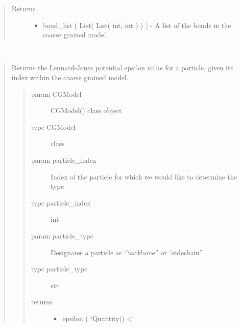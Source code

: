 \documentclass[letterpaper,12pt,english,openany,oneside]{sphinxmanual}
\begin{document}
\begin{fulllineitems}
\begin{fulllineitems}
\begin{quote}
\begin{description}
\item[{Returns}] \leavevmode
\begin{itemize}
\item {} 
bond\_list ( List( List( int, int ) ) ) - A list of the bonds in the coarse grained model.

\end{itemize}


\end{description}\end{quote}

\end{fulllineitems}


\begin{fulllineitems}
\label{\detokenize{cg_model:cg_model.cgmodel.CGModel.get_epsilon}}~\begin{quote}

Returns the Lennard-Jones potential epsilon value for a particle, given its index within the coarse grained model.
\begin{quote}\begin{description}
\item[{param CGModel}] \leavevmode
CGModel() class object

\item[{type CGModel}] \leavevmode
class

\item[{param particle\_index}] \leavevmode
Index of the particle for which we would like to determine the type

\item[{type particle\_index}] \leavevmode
int

\item[{param particle\_type}] \leavevmode
Designates a particle as “backbone” or “sidechain”

\item[{type particle\_type}] \leavevmode
str

\item[{returns}] \leavevmode\begin{itemize}
\item {} 
epsilon ( {\color{red}\bfseries{}{}`}Quantity() \textless{}


\end{itemize}
\end{description}
\end{quote}
\end{quote}
\end{fulllineitems}
\end{fulllineitems}
\end{document}
